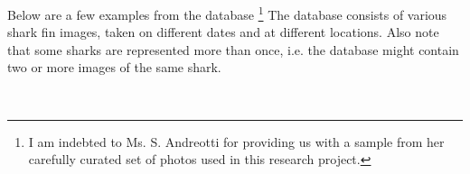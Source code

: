\documentclass[a4paper,10pt]{article}
\begin{document}
\newpage
Below are a few examples from the database \footnote{I am indebted to
  Ms. S. Andreotti for providing us with a sample from her carefully
    curated set of photos used in this research project.}  
The database consists of various shark fin images, taken on different dates and
at different locations.
Also note that some sharks are
  represented more than once, i.e. the database
might contain two or more images of the same shark.

\begin{figure}[H]
\centering
\mbox{ \quad
{} \quad
{}}
\end{figure}
\end{document}
